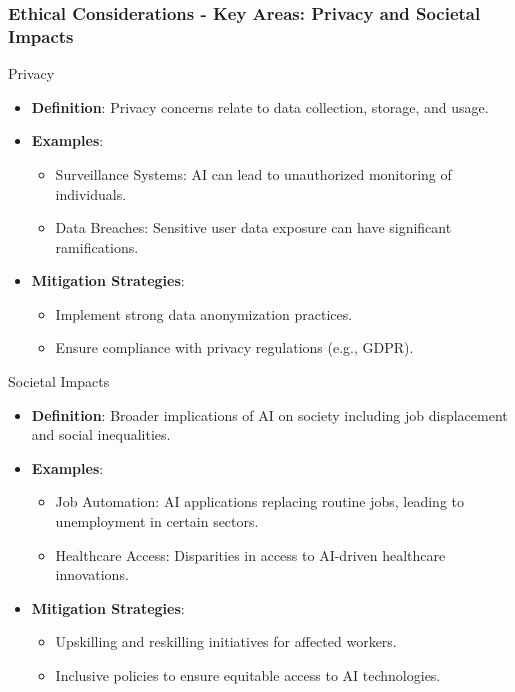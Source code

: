 \documentclass{beamer}
\begin{document}
\begin{frame}[fragile]
    \frametitle{Ethical Considerations - Key Areas: Privacy and Societal Impacts}
    \begin{block}{Privacy}
        \begin{itemize}
            \item \textbf{Definition}: Privacy concerns relate to data collection, storage, and usage.
            \item \textbf{Examples}:
                \begin{itemize}
                    \item Surveillance Systems: AI can lead to unauthorized monitoring of individuals.
                    \item Data Breaches: Sensitive user data exposure can have significant ramifications.
                \end{itemize}
            \item \textbf{Mitigation Strategies}:
                \begin{itemize}
                    \item Implement strong data anonymization practices.
                    \item Ensure compliance with privacy regulations (e.g., GDPR).
                \end{itemize}
        \end{itemize}
    \end{block}

    \begin{block}{Societal Impacts}
        \begin{itemize}
            \item \textbf{Definition}: Broader implications of AI on society including job displacement and social inequalities.
            \item \textbf{Examples}:
                \begin{itemize}
                    \item Job Automation: AI applications replacing routine jobs, leading to unemployment in certain sectors.
                    \item Healthcare Access: Disparities in access to AI-driven healthcare innovations.
                \end{itemize}
            \item \textbf{Mitigation Strategies}:
                \begin{itemize}
                    \item Upskilling and reskilling initiatives for affected workers.
                    \item Inclusive policies to ensure equitable access to AI technologies.
                \end{itemize}
        \end{itemize}
    \end{block}
\end{frame}
\end{document}
